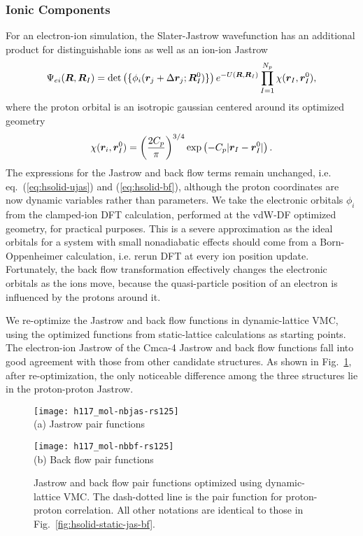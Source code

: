 \subsubsection{Ionic Components}
For an electron-ion simulation, the Slater-Jastrow wavefunction has an additional product for distinguishable ions as well as an ion-ion Jastrow
\begin{align}
\Psi_{ei}(\boldsymbol{R}, \boldsymbol{R}_I) = \det\left( \{ \phi_i(\boldsymbol{r}_j+\Delta\boldsymbol{r}_j; \boldsymbol{R}_I^0)\} \right) e^{-U(\boldsymbol{R},\boldsymbol{R}_I)} \prod\limits_{I=1}^{N_p} \chi(\boldsymbol{r}_I, \boldsymbol{r}_I^0),
\end{align}
where the proton orbital is an isotropic gaussian centered around its optimized geometry
\begin{align}
\chi(\boldsymbol{r}_i, \boldsymbol{r}_I^0) = \left(\dfrac{2C_p}{\pi}\right)^{3/4} \exp\left(
-C_p\vert\boldsymbol{r}_I-\boldsymbol{r}_I^0\vert
\right).
\end{align}
The expressions for the Jastrow and back flow terms remain unchanged, i.e. eq.~(\ref{eq:hsolid-ujas}) and (\ref{eq:hsolid-bf}), although the proton coordinates are now dynamic variables rather than parameters.
We take the electronic orbitals $\phi_i$ from the clamped-ion DFT calculation, performed at the vdW-DF optimized geometry, for practical purposes.
This is a severe approximation as the ideal orbitals for a system with small nonadiabatic effects should come from a Born-Oppenheimer calculation, i.e. rerun DFT at every ion position update.
Fortunately, the back flow transformation effectively changes the electronic orbitals as the ions move, because the quasi-particle position of an electron is influenced by the protons around it.

We re-optimize the Jastrow and back flow functions in dynamic-lattice VMC, using the optimized functions from static-lattice calculations as starting points.
The electron-ion Jastrow of the Cmca-4 Jastrow and back flow functions fall into good agreement with those from other candidate structures.
As shown in Fig.~\ref{fig:hsolid-dynamic-jas-bf}, after re-optimization, the only noticeable difference among the three structures lie in the proton-proton Jastrow.

\begin{figure}[h]
\centering
\begin{minipage}{0.49\textwidth}
\centering
\texttt{[image: h117\_mol-nbjas-rs125]}\\
(a) Jastrow pair functions
\end{minipage}
\begin{minipage}{0.49\textwidth}
\centering
\texttt{[image: h117\_mol-nbbf-rs125]}\\
(b) Back flow pair functions
\end{minipage}
\caption{Jastrow and back flow pair functions optimized using dynamic-lattice VMC. The dash-dotted line is the pair function for proton-proton correlation. All other notations are identical to those in Fig.~\ref{fig:hsolid-static-jas-bf}.}
\label{fig:hsolid-dynamic-jas-bf}
\end{figure}

